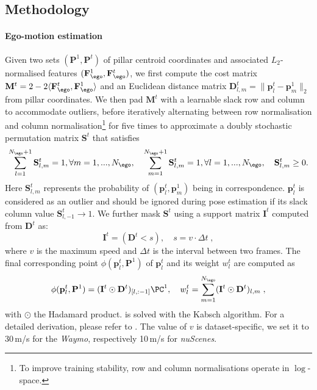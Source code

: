 \subsection{Methodology}
\label{sec:supp_method}
\paragraph{Ego-motion estimation}
Given two sets $(\mathbf{P}^1,\mathbf{P}^t)$ of pillar centroid coordinates and associated $L_2$-normalised features $(\mathbf{F}^1_{\ego}, \mathbf{F}^t_{\ego})$, we first compute the cost matrix $\mathbf{M}^t = 2 - 2\langle \mathbf{F}^t_{\ego}, {\mathbf{F}^1_{\ego}}\rangle$ and an Euclidean distance matrix $\mathbf{D}^t_{l,m} = \|\mathbf{p}^t_l - \mathbf{p}^1_m\|_2$ from pillar coordinates. We then pad $\mathbf{M}^t$ with a learnable slack row and column to accommodate outliers, before iteratively alternating between row normalisation and column normalisation\footnote{To improve training stability, row and column normalisations operate in $\log$-space.} for five times to approximate a doubly stochastic permutation matrix $\mathbf{S}^t$ that satisfies
\begin{equation}
    \sum_{l=1}^{N_\ego+1} \mathbf{S}^t_{l, m} =1, \forall m=1, ..., N_\ego,  \quad \sum_{m=1}^{N_\ego+1} \mathbf{S}^t_{l, m} =1, \forall l=1, ..., N_\ego, \quad \mathbf{S}^t_{l,m} \geq 0. 
\end{equation}
Here $\mathbf{S}^t_{l,m}$ represents the probability of $(\mathbf{p}_l^t, \mathbf{p}_m^1)$ being in correspondence. $\mathbf{p}_l^t$ is considered as an outlier and should be ignored during pose estimation if its slack column value $\mathbf{S}^t_{l,-1} \rightarrow 1$.
We further mask $\mathbf{S}^t$ using a support matrix $\mathbf{I}^t$ computed from $\mathbf{D}^t$ as:
\begin{equation}
    \mathbf{I}^t = \left(\mathbf{D}^t < s\right), \quad s = v \cdot \Delta t\;,
\end{equation}
where $v$ is the maximum speed and $\Delta t$ is the interval between two frames. The final corresponding point $\phi(\mathbf{p}_l^t, \mathbf{P}^1)$ of $\mathbf{p}_l^t$ and its weight $w_l^t$ are computed as
\begin{equation}
    \phi(\mathbf{p}_l^t, \mathbf{P}^1) = (\mathbf{I}^t \odot \mathbf{D}^t)_{[l, :-1]} \PC^1, \quad w_l^t = \sum_{m=1}^{N_\ego} (\mathbf{I}^t \odot \mathbf{D}^t)_{l, m}\;,
\end{equation}
with $\odot$ the Hadamard product.  is solved with the Kabsch algorithm. For a detailed derivation, please refer to \cite{gojcic2021weakly}. The value of $v$ is dataset-specific, we set it to 30$\,$m/s for the \emph{Waymo}, respectively 10$\,$m/s for \emph{nuScenes}.

